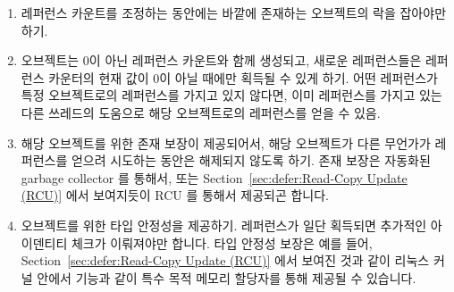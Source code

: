 \begin{enumerate}
\item	레퍼런스 카운트를 조정하는 동안에는 바깥에 존재하는 오브젝트의 락을
	잡아야만 하기.
\item	오브젝트는 0이 아닌 레퍼런스 카운트와 함께 생성되고, 새로운
	레퍼런스들은 레퍼런스 카운터의 현재 값이 0이 아닐 때에만 획득될 수 있게
	하기.
	어떤 레퍼런스가 특정 오브젝트로의 레퍼런스를 가지고 있지 않다면, 이미
	레퍼런스를 가지고 있는 다른 쓰레드의 도움으로 해당 오브젝트로의
	레퍼런스를 얻을 수 있음.
\item	해당 오브젝트를 위한 존재 보장이 제공되어서, 해당 오브젝트가 다른
	무언가가 레퍼런스를 얻으려 시도하는 동안은 해제되지 않도록 하기.
	존재 보장은 자동화된 garbage collector 를 통해서, 또는
	Section~\ref{sec:defer:Read-Copy Update (RCU)} 에서 보여지듯이 RCU 를
	통해서 제공되곤 합니다.
\item	오브젝트를 위한 타입 안정성을 제공하기.
	레퍼런스가 일단 획득되면 추가적인 아이덴티티 체크가 이뤄져야만 합니다.
	타입 안정성 보장은 예를 들어,
	Section~\ref{sec:defer:Read-Copy Update (RCU)} 에서 보여진 것과 같이
	리눅스 커널 안에서  기능과 같이 특수 목적
	메모리 할당자를 통해 제공될 수 있습니다.
\iffalse

\item	A lock residing outside of the object must be held while
	manipulating the reference count.
\item	The object is created with a non-zero reference count, and new
	references may be acquired only when the current value of
	the reference counter is non-zero.
	If a thread does not have a reference to a given object,
	it may obtain one with the help of another thread that
	already has a reference.
\item	An existence guarantee is provided for the object, preventing
	it from being freed while some other
	entity might be attempting to acquire a reference.
	Existence guarantees are often provided by automatic
	garbage collectors, and, as will be seen in
	Section~\ref{sec:defer:Read-Copy Update (RCU)}, by RCU.
\item	A type-safety guarantee is provided for the object.
	An additional identity check must be performed once
	the reference is acquired.
	Type-safety guarantees can be provided by special-purpose
	memory allocators, for example, by the
	\co{SLAB_TYPESAFE_BY_RCU} feature within the Linux kernel,
	as will be seen in Section~\ref{sec:defer:Read-Copy Update (RCU)}.
\fi
\end{enumerate}

